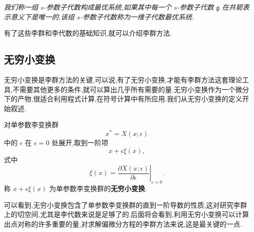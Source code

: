 \begin{definition}[一维子代数最优系统]
    \emph{我们称一组 $s$-参数子代数构成最优系统,如果其中每一个 $s$-参数子代数 $\mathfrak{g}$ 在共轭表示意义下是唯一的.该组 $s$-参数子代数称为一维子代数最优系统.}
\end{definition}

有了这些李群和李代数的基础知识,就可以介绍李群方法.

\subsection{无穷小变换}
无穷小变换是李群方法的关键,可以说,有了无穷小变换,才能有李群方法这套理论工具,不需要其他更多的条件,就可以算出几乎所有需要的量.无穷小变换作为一个微分下的产物,很适合利用程式计算,在符号计算中有所应用.我们从无穷小变换的定义开始叙述.


对单参数李变换群
\begin{equation}\label{eq:liet}
x^{*}=X(x;\epsilon)
\end{equation}
中的 $\epsilon$ 在 $\epsilon=0$ 处展开,取到一阶项
\begin{equation*}
x+\epsilon \xi(x),
\end{equation*}
式中
\begin{equation*}
\xi(x)=\left.\frac{\partial X(x;\epsilon)}{\partial \epsilon}\right|_{\epsilon=0}.
\end{equation*}
称 $x+\epsilon \xi(x)$ 为单参数李变换群的\textbf{无穷小变换}.

可以看到,无穷小变换包含了单参数李变换群的直到一阶导数的性质,这对研究李群上的切空间,尤其是李代数来说是足够了的.后面将会看到,利用无穷小变换可以计算出点对称的许多重要的量,对求解偏微分方程的李群方法来说,这是最关键的一点.

